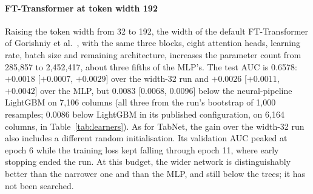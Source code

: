 \paragraph{FT-Transformer at token width 192}
Raising the token width from 32 to 192, the width of the default FT-Transformer of Gorishniy et
al.~\cite{gorishniy2021revisiting}, with the same three blocks, eight attention heads, learning rate,
batch size and remaining architecture, increases the parameter count from 285,857 to 2,452,417, about three
fifths of the MLP's. The test AUC is 0.6578: $+0.0018$ [$+0.0007$, $+0.0029$] over the width-32 run and
$+0.0026$ [$+0.0011$, $+0.0042$] over the MLP, but 0.0083 [0.0068, 0.0096] below the neural-pipeline
LightGBM on 7,106 columns (all three from the run's bootstrap of 1,000 resamples; 0.0086 below LightGBM in
its published configuration, on 6,164 columns, in Table~\ref{tab:learners}). As for TabNet, the gain over
the width-32 run also includes a different random initialisation. Its validation AUC peaked at epoch 6 while the training loss kept falling through epoch 11,
where early stopping ended the run. At this budget, the wider network is distinguishably better than the
narrower one and than the MLP, and still below the trees; it has not been searched.

